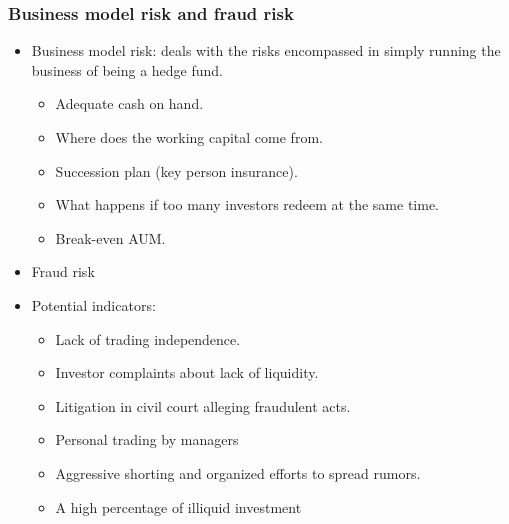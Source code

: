 \subsubsection{Business model risk and fraud risk}
\begin{itemize}
\item Business model risk: deals with the risks encompassed in simply running the business of being a hedge fund.
    \begin{itemize}
    \item Adequate cash on hand.
    \item Where does the working capital come from.
    \item Succession plan (key person insurance).
    \item What happens if too many investors redeem at the same time.
    \item Break-even AUM.
    \end{itemize}
\item Fraud risk
\item Potential indicators:
    \begin{itemize}
    \item Lack of trading independence.
    \item Investor complaints about lack of liquidity.
    \item Litigation in civil court alleging fraudulent acts.
    \item Personal trading by managers
    \item Aggressive shorting and organized efforts to spread rumors.
    \item A high percentage of illiquid investment
    \end{itemize}
\end{itemize}



